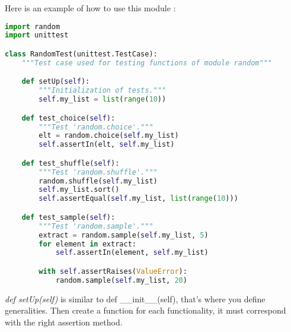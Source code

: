 \documentclass[a4paper, 12pt, titlepage]{scrartcl} %
\begin{document}
Here is an example of how to use this module :
\begin{lstlisting}[language=Python]
import random
import unittest

class RandomTest(unittest.TestCase):
    """Test case used for testing functions of module random"""

    def setUp(self):
        """Initialization of tests."""
        self.my_list = list(range(10))

    def test_choice(self):
        """Test 'random.choice'."""
        elt = random.choice(self.my_list)
        self.assertIn(elt, self.my_list)

    def test_shuffle(self):
        """Test 'random.shuffle'."""
        random.shuffle(self.my_list)
        self.my_list.sort()
        self.assertEqual(self.my_list, list(range(10)))

    def test_sample(self):
        """Test 'random.sample'."""
        extract = random.sample(self.my_list, 5)
        for element in extract:
            self.assertIn(element, self.my_list)

        with self.assertRaises(ValueError):
            random.sample(self.my_list, 20)
\end{lstlisting} \vspace{5mm}

\textit{def setUp(self)} is similar to def \_\_init\_\_(self), that's where you define generalities.
Then create a function for each functionality, it must correspond with the right assertion method.

\vspace{5mm}
\end{document}
